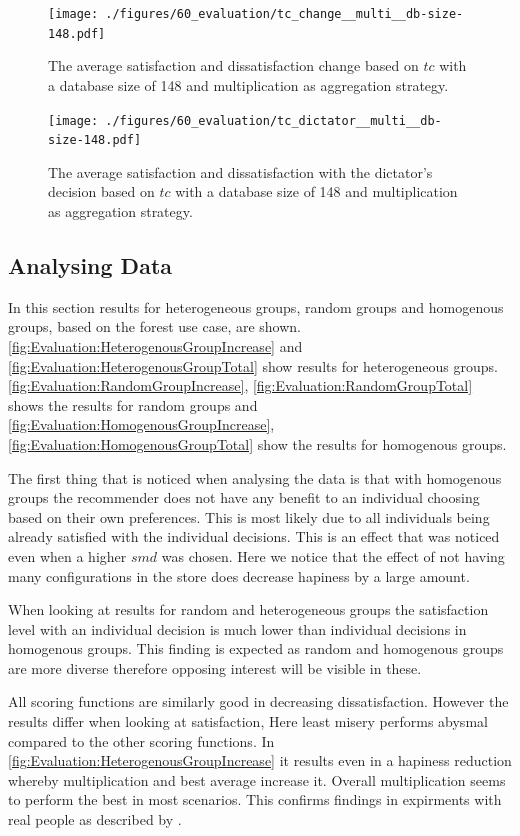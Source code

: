 \begin{figure}
    \centering
    \texttt{[image: ./figures/60\_evaluation/tc\_change\_\_multi\_\_db-size-148.pdf]}
    \caption{The average satisfaction and dissatisfaction change based on $tc$ with a database size of 148 and multiplication as aggregation strategy.}
    \label{fig:Evaluation:tcChange}
\end{figure}

\begin{figure}
    \centering
    \texttt{[image: ./figures/60\_evaluation/tc\_dictator\_\_multi\_\_db-size-148.pdf]}
    \caption{The average satisfaction and dissatisfaction with the dictator's decision based on $tc$ with a database size of 148 and multiplication as aggregation strategy.}
    \label{fig:Evaluation:tcCount}
\end{figure}

\subsection{Analysing Data}

In this section results for heterogeneous groups, random groups and homogenous groups, based on the forest use case, are shown. \autoref{fig:Evaluation:HeterogenousGroupIncrease} and \autoref{fig:Evaluation:HeterogenousGroupTotal} show results for heterogeneous groups. \autoref{fig:Evaluation:RandomGroupIncrease}, \autoref{fig:Evaluation:RandomGroupTotal} shows the results for random groups and \autoref{fig:Evaluation:HomogenousGroupIncrease}, \autoref{fig:Evaluation:HomogenousGroupTotal} show the results for homogenous groups.

The first thing that is noticed when analysing the data is that with homogenous groups the recommender does not have any benefit to an individual choosing based on their own preferences. This is most likely due to all individuals being already satisfied with the individual decisions. This is an effect that was noticed even when a higher $smd$ was chosen. Here we notice that the effect of not having many configurations in the store does decrease hapiness by a large amount.

When looking at results for random and heterogeneous groups the satisfaction level with an individual decision is much lower than individual decisions in homogenous groups. This finding is expected as random and homogenous groups are more diverse therefore opposing interest will be visible in these.

All scoring functions are similarly good in decreasing dissatisfaction. However the results differ when looking at satisfaction, Here least misery performs abysmal compared to the other scoring functions. In \autoref{fig:Evaluation:HeterogenousGroupIncrease} it results even in a hapiness reduction whereby multiplication and best average increase it. Overall multiplication seems to perform the best in most scenarios. This confirms findings in expirments with real people as described by \citeauthor{Masthoff2015} \cite[p. 755f]{Masthoff2015}.

